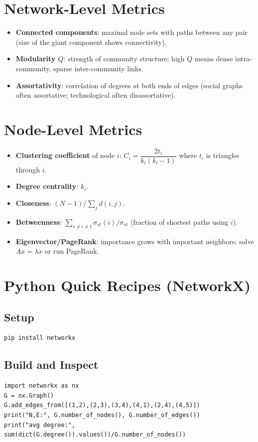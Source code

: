 \section{Network-Level Metrics}
\begin{itemize}
    \item \textbf{Connected components}: maximal node sets with paths between any pair (size of the giant component shows connectivity).
    \item \textbf{Modularity $Q$}: strength of community structure; high $Q$ means dense intra-community, sparse inter-community links.
    \item \textbf{Assortativity}: correlation of degrees at both ends of edges (social graphs often assortative; technological often disassortative).
\end{itemize}

\section{Node-Level Metrics}
\begin{itemize}
    \item \textbf{Clustering coefficient} of node $i$: $C_i = \dfrac{2 t_i}{k_i(k_i-1)}$ where $t_i$ is triangles through $i$.
    \item \textbf{Degree centrality}: $k_i$.
    \item \textbf{Closeness}: $(N-1)/\sum_j d(i,j)$.
    \item \textbf{Betweenness}: $\sum_{s\neq i\neq t} \sigma_{st}(i)/\sigma_{st}$ (fraction of shortest paths using $i$).
    \item \textbf{Eigenvector/PageRank}: importance grows with important neighbors; solve $Ax=\lambda x$ or run PageRank.
\end{itemize}

\section{Python Quick Recipes (NetworkX)}
\subsection*{Setup}
\begin{lstlisting}
pip install networkx
\end{lstlisting}

\subsection*{Build and Inspect}
\begin{lstlisting}
import networkx as nx
G = nx.Graph()
G.add_edges_from([(1,2),(2,3),(3,4),(4,1),(2,4),(4,5)])
print("N,E:", G.number_of_nodes(), G.number_of_edges())
print("avg degree:", sum(dict(G.degree()).values())/G.number_of_nodes())
\end{lstlisting}

